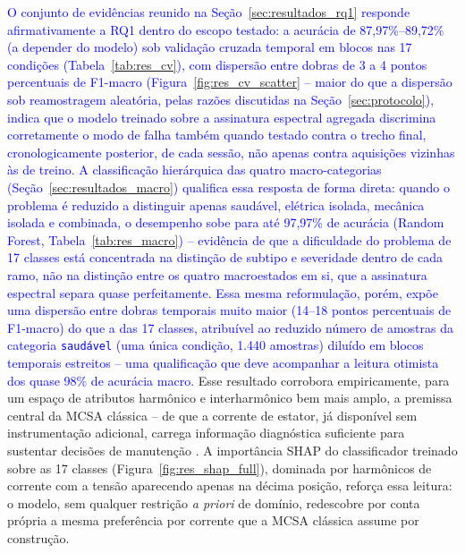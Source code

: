 \documentclass[times,final]{elsarticle}
\begin{document}
\textcolor{blue}{O conjunto de evidências reunido na Seção~\ref{sec:resultados_rq1} responde afirmativamente a RQ1 dentro do escopo testado: a acurácia de 87,97\%--89,72\% (a depender do modelo) sob validação cruzada temporal em blocos nas 17 condições (Tabela~\ref{tab:res_cv}), com dispersão entre dobras de 3 a 4 pontos percentuais de F1-macro (Figura~\ref{fig:res_cv_scatter} -- maior do que a dispersão sob reamostragem aleatória, pelas razões discutidas na Seção~\ref{sec:protocolo}), indica que o modelo treinado sobre a assinatura espectral agregada discrimina corretamente o modo de falha também quando testado contra o trecho final, cronologicamente posterior, de cada sessão, não apenas contra aquisições vizinhas às de treino. A classificação hierárquica das quatro macro-categorias (Seção~\ref{sec:resultados_macro}) qualifica essa resposta de forma direta: quando o problema é reduzido a distinguir apenas saudável, elétrica isolada, mecânica isolada e combinada, o desempenho sobe para até 97,97\% de acurácia (Random Forest, Tabela~\ref{tab:res_macro}) -- evidência de que a dificuldade do problema de 17 classes está concentrada na distinção de subtipo e severidade dentro de cada ramo, não na distinção entre os quatro macroestados em si, que a assinatura espectral separa quase perfeitamente. Essa mesma reformulação, porém, expõe uma dispersão entre dobras temporais muito maior (14--18 pontos percentuais de F1-macro) do que a das 17 classes, atribuível ao reduzido número de amostras da categoria \texttt{saudável} (uma única condição, 1.440 amostras) diluído em blocos temporais estreitos -- uma qualificação que deve acompanhar a leitura otimista dos quase 98\% de acurácia macro.} Esse resultado corrobora empiricamente, para um espaço de atributos harmônico e interharmônico bem mais amplo, a premissa central da MCSA clássica -- de que a corrente de estator, já disponível sem instrumentação adicional, carrega informação diagnóstica suficiente para sustentar decisões de manutenção \citep{thomson2001,nandi2005}. A importância SHAP do classificador treinado sobre as 17 classes (Figura~\ref{fig:res_shap_full}), dominada por harmônicos de corrente com a tensão aparecendo apenas na décima posição, reforça essa leitura: o modelo, sem qualquer restrição \textit{a priori} de domínio, redescobre por conta própria a mesma preferência por corrente que a MCSA clássica assume por construção.
\end{document}
